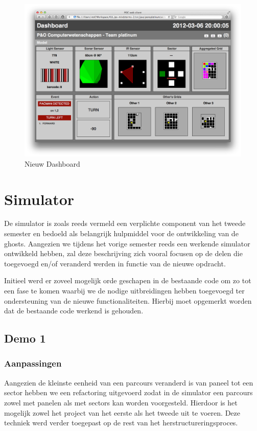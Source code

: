 \documentclass[12pt,a4paper]{report}
\begin{document}
\begin{figure}[htbp]
  \centering
  \includegraphics[width=155mm]{resources/dashboard.png}
  \caption{Nieuw Dashboard}
  \label{fig:dashboard}
\end{figure}

\chapter{Simulator}

De simulator is zoals reeds vermeld een verplichte component van het tweede semester en bedoeld als belangrijk hulpmiddel voor de ontwikkeling van de ghosts. Aangezien we tijdens het vorige semester reeds een werkende simulator ontwikkeld hebben, zal deze beschrijving zich vooral focusen op de delen die toegevoegd en/of veranderd werden in functie van de nieuwe opdracht.

Initieel werd er zoveel mogelijk orde geschapen in de bestaande code om zo tot een fase te komen waarbij we de nodige uitbreidingen hebben toegevoegd ter ondersteuning van de nieuwe functionaliteiten. Hierbij moet opgemerkt worden dat de bestaande code werkend is gehouden. 

\section{Demo 1}

\subsection{Aanpassingen}

Aangezien de kleinste eenheid van een parcours veranderd is van paneel tot een sector hebben we een refactoring uitgevoerd zodat in de simulator een parcours zowel met panelen als met sectors kan worden voorgesteld. Hierdoor is het mogelijk zowel het project van het eerste als het tweede uit te voeren. Deze techniek werd verder toegepast op de rest van het herstructureringsproces. 
\end{document}

